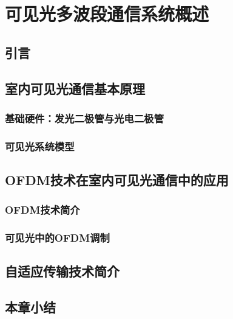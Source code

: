
\chapter{可见光多波段通信系统概述} 
\section{引言}
\section{室内可见光通信基本原理}
\subsection{基础硬件：发光二极管与光电二极管}
\subsection{可见光系统模型}
\section{OFDM技术在室内可见光通信中的应用}
\subsection{OFDM技术简介}
\subsection{可见光中的OFDM调制}
\section{自适应传输技术简介}
\section{本章小结}